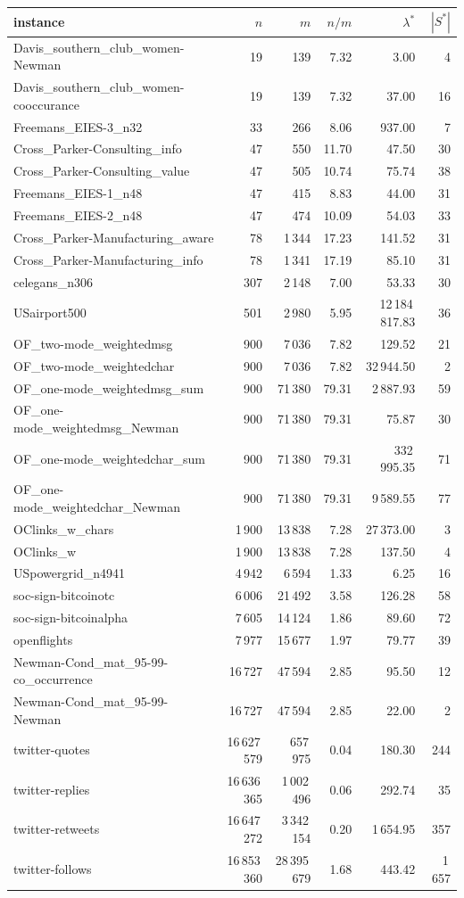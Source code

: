 \begin{tabular}{lrrrrr}
\toprule
instance & $n$ & $m$ & $n/m$ & $\lambda^*$ & $|S^*|$ \\
\midrule
Davis_southern_club_women-Newman & 19 & 139 & 7.32 & 3.00 & 4 \\
Davis_southern_club_women-cooccurance & 19 & 139 & 7.32 & 37.00 & 16 \\
Freemans_EIES-3_n32 & 33 & 266 & 8.06 & 937.00 & 7 \\
Cross_Parker-Consulting_info & 47 & 550 & 11.70 & 47.50 & 30 \\
Cross_Parker-Consulting_value & 47 & 505 & 10.74 & 75.74 & 38 \\
Freemans_EIES-1_n48 & 47 & 415 & 8.83 & 44.00 & 31 \\
Freemans_EIES-2_n48 & 47 & 474 & 10.09 & 54.03 & 33 \\
Cross_Parker-Manufacturing_aware & 78 & 1\,344 & 17.23 & 141.52 & 31 \\
Cross_Parker-Manufacturing_info & 78 & 1\,341 & 17.19 & 85.10 & 31 \\
celegans_n306 & 307 & 2\,148 & 7.00 & 53.33 & 30 \\
USairport500 & 501 & 2\,980 & 5.95 & 12\,184\,817.83 & 36 \\
OF_two-mode_weightedmsg & 900 & 7\,036 & 7.82 & 129.52 & 21 \\
OF_two-mode_weightedchar & 900 & 7\,036 & 7.82 & 32\,944.50 & 2 \\
OF_one-mode_weightedmsg_sum & 900 & 71\,380 & 79.31 & 2\,887.93 & 59 \\
OF_one-mode_weightedmsg_Newman & 900 & 71\,380 & 79.31 & 75.87 & 30 \\
OF_one-mode_weightedchar_sum & 900 & 71\,380 & 79.31 & 332\,995.35 & 71 \\
OF_one-mode_weightedchar_Newman & 900 & 71\,380 & 79.31 & 9\,589.55 & 77 \\
OClinks_w_chars & 1\,900 & 13\,838 & 7.28 & 27\,373.00 & 3 \\
OClinks_w & 1\,900 & 13\,838 & 7.28 & 137.50 & 4 \\
USpowergrid_n4941 & 4\,942 & 6\,594 & 1.33 & 6.25 & 16 \\
soc-sign-bitcoinotc & 6\,006 & 21\,492 & 3.58 & 126.28 & 58 \\
soc-sign-bitcoinalpha & 7\,605 & 14\,124 & 1.86 & 89.60 & 72 \\
openflights & 7\,977 & 15\,677 & 1.97 & 79.77 & 39 \\
Newman-Cond_mat_95-99-co_occurrence & 16\,727 & 47\,594 & 2.85 & 95.50 & 12 \\
Newman-Cond_mat_95-99-Newman & 16\,727 & 47\,594 & 2.85 & 22.00 & 2 \\
twitter-quotes & 16\,627\,579 & 657\,975 & 0.04 & 180.30 & 244 \\
twitter-replies & 16\,636\,365 & 1\,002\,496 & 0.06 & 292.74 & 35 \\
twitter-retweets & 16\,647\,272 & 3\,342\,154 & 0.20 & 1\,654.95 & 357 \\
twitter-follows & 16\,853\,360 & 28\,395\,679 & 1.68 & 443.42 & 1\,657 \\
\bottomrule
\end{tabular}
